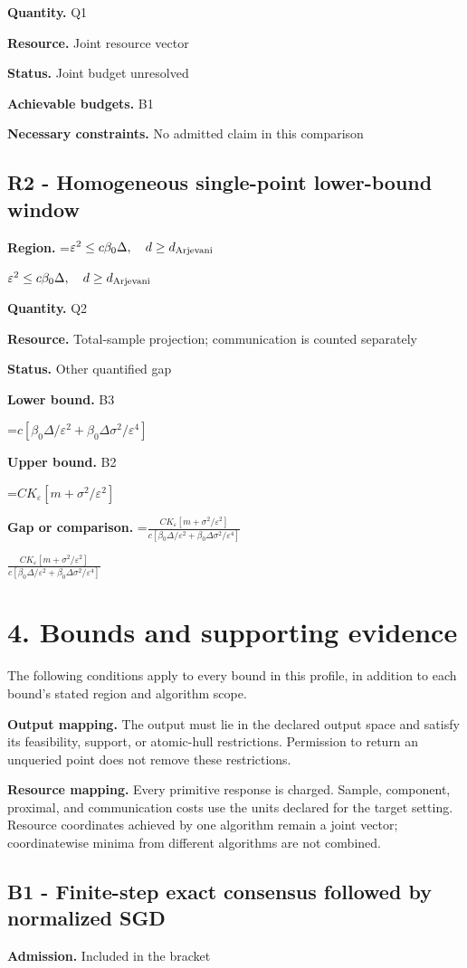 \documentclass[10pt,a4paper]{article}
\newcommand{\AtlasMath}[1]{\par\begingroup\centering\setbox0=\hbox{$\displaystyle #1$}\ifdim\wd0>1.4\linewidth\typeout{ATLAS WIDE FORMULA: \the\wd0}\fi\ifdim\wd0>\linewidth\resizebox{\linewidth}{!}{\box0}\else\box0\fi\par\endgroup}
\newcommand{\AtlasInlineMath}[1]{\begingroup\setbox0=\hbox{$#1$}\ifdim\wd0>.4\linewidth\endgroup\AtlasMath{#1}\else\endgroup$#1$\fi}
\begin{document}
\textbf{Quantity.} Q1

\textbf{Resource.} Joint resource vector

\textbf{Status.} Joint budget unresolved

\textbf{Achievable budgets.} B1

\textbf{Necessary constraints.} No admitted claim in this comparison

\subsection{R2 - Homogeneous single-point lower-bound window}
\textbf{Region.} \AtlasInlineMath{\varepsilon^2\le c\beta_0\Delta,\quad d\ge d_{\rm Arjevani}}

\textbf{Quantity.} Q2

\textbf{Resource.} Total-sample projection; communication is counted separately

\textbf{Status.} Other quantified gap

\textbf{Lower bound.} B3

\AtlasMath{c[\beta_0\Delta/\varepsilon^2+\beta_0\Delta\sigma^2/\varepsilon^4]}
\textbf{Upper bound.} B2

\AtlasMath{CK_\varepsilon[m+\sigma^2/\varepsilon^2]}
\textbf{Gap or comparison.} \AtlasInlineMath{\frac{CK_\varepsilon[m+\sigma^2/\varepsilon^2]}{c[\beta_0\Delta/\varepsilon^2+\beta_0\Delta\sigma^2/\varepsilon^4]}}

\section{4. Bounds and supporting evidence}
The following conditions apply to every bound in this profile, in addition to each bound's stated region and algorithm scope.

\textbf{Output mapping.} The output must lie in the declared output space and satisfy its feasibility, support, or atomic-hull restrictions. Permission to return an unqueried point does not remove these restrictions.

\textbf{Resource mapping.} Every primitive response is charged. Sample, component, proximal, and communication costs use the units declared for the target setting. Resource coordinates achieved by one algorithm remain a joint vector; coordinatewise minima from different algorithms are not combined.

\subsection{B1 - Finite-step exact consensus followed by normalized SGD}
\textbf{Admission.} Included in the bracket
\end{document}
